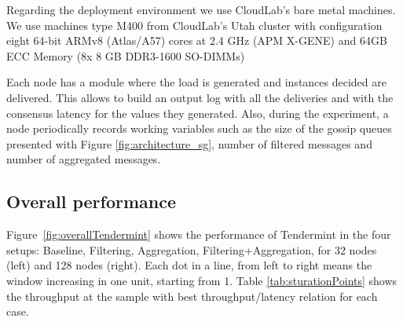 Regarding the deployment environment we use CloudLab's\cite{Duplyakin+:ATC19} bare metal machines. 
We use machines type M400 from CloudLab's Utah cluster with configuration eight 64-bit ARMv8 (Atlas/A57) cores at 2.4 GHz (APM X-GENE) and 64GB ECC Memory (8x 8 GB DDR3-1600 SO-DIMMs)

Each node has a module where the load is generated and instances decided are 
delivered.
This allows to build an output log with all the deliveries and with the consensus latency for the values they generated. Also, during the experiment, a node periodically records working variables such as the size of the gossip queues presented with Figure \ref{fig:architecture_sg}, number of filtered messages and number of aggregated messages.

\subsection{Overall performance}
\label{sec:overall}

Figure~\ref{fig:overallTendermint} shows the performance of Tendermint 
in the four setups:  Baseline, Filtering, Aggregation, Filtering+Aggregation, for 32 nodes (left) and 128 nodes (right).   
Each dot in a line, from left to right means the window increasing in one unit, starting from 1.    
Table \ref{tab:sturationPoints} shows the throughput at the sample with best throughput/latency relation for each case.

